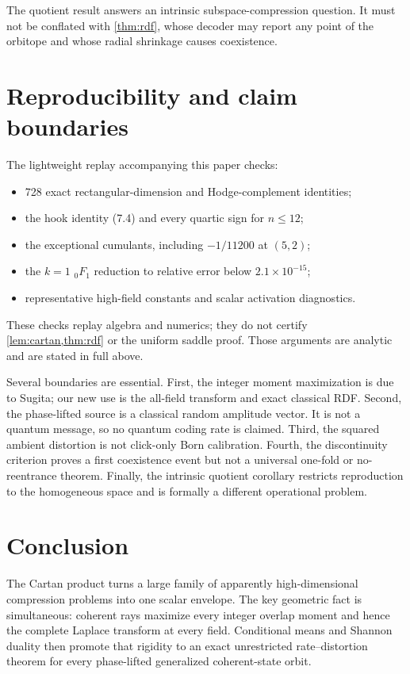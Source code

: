 \documentclass[11pt,a4paper]{article}
\begin{document}
The quotient result answers an intrinsic subspace-compression question.  It
must not be conflated with \cref{thm:rdf}, whose decoder may report any point
of the orbitope and whose radial shrinkage causes coexistence.

\section{Reproducibility and claim boundaries}

The lightweight replay accompanying this paper checks:
\begin{itemize}
\item 728 exact rectangular-dimension and Hodge-complement identities;
\item the hook identity (7.4) and every quartic sign for $n\le12$;
\item the exceptional cumulants, including $-1/11200$ at $(5,2)$;
\item the $k=1$ ${}_0F_1$ reduction to relative error below
$2.1\times10^{-15}$;
\item representative high-field constants and scalar activation
diagnostics.
\end{itemize}
These checks replay algebra and numerics; they do not certify
\cref{lem:cartan,thm:rdf} or the uniform saddle proof.  Those arguments are
analytic and are stated in full above.

Several boundaries are essential.  First, the integer moment maximization
is due to Sugita; our new use is the all-field transform and exact classical
RDF.  Second, the phase-lifted source is a classical random amplitude vector.
It is not a quantum message, so no quantum coding rate is claimed.  Third,
the squared ambient distortion is not click-only Born calibration.  Fourth,
the discontinuity criterion proves a first coexistence event but not a
universal one-fold or no-reentrance theorem.  Finally, the intrinsic quotient
corollary restricts reproduction to the homogeneous space and is formally a
different operational problem.

\section{Conclusion}

The Cartan product turns a large family of apparently high-dimensional
compression problems into one scalar envelope.  The key geometric fact is
simultaneous: coherent rays maximize every integer overlap moment and hence
the complete Laplace transform at every field.  Conditional means and
Shannon duality then promote that rigidity to an exact unrestricted
rate--distortion theorem for every phase-lifted generalized coherent-state
orbit.
\end{document}
